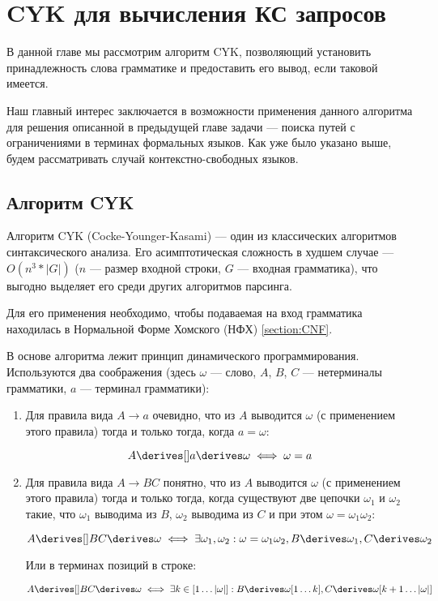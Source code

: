 \section{CYK для вычисления КС запросов}

В данной главе мы рассмотрим алгоритм CYK, позволяющий установить принадлежность слова грамматике и предоставить его вывод, если таковой имеется.

Наш главный интерес заключается в возможности применения данного алгоритма для решения описанной в предыдущей главе задачи --- поиска путей с ограничениями в терминах формальных языков. Как уже было указано выше, будем рассматривать случай контекстно-свободных языков.

\subsection{Алгоритм CYK}

Алгоритм CYK (Cocke-Younger-Kasami) –-- один из классических алгоритмов синтаксического анализа. Его асимптотическая сложность в худшем случае --- $O(n^3 * |G|)$ ($n$ --- размер входной строки, $G$ --- входная грамматика), что выгодно выделяет его среди других алгоритмов парсинга.

Для его применения необходимо, чтобы подаваемая на вход грамматика находилась в Нормальной Форме Хомского (НФХ) \ref{section:CNF}.  

В основе алгоритма лежит принцип динамического программирования. Используются два соображения (здесь $\omega$ --- слово, $A$, $B$, $C$ --- нетерминалы грамматики, $a$ --- терминал грамматики):  

\begin{enumerate}
\item Для правила вида $A \to a$ очевидно, что из $A$ выводится $\omega$ (с применением этого правила) тогда и только тогда, когда $a = \omega$:

\[
  A \derives[] a \derives \omega \iff \omega = a\]
  
\item Для правила вида $A \to B C$ понятно, что из $A$ выводится $\omega$ (с применением этого правила) тогда и только тогда, когда существуют две цепочки $\omega_1$ и $\omega_2$ такие, что $\omega_1$ выводима из $B$, $\omega_2$ выводима из $C$ и при этом $\omega = \omega_1 \omega_2$: 

\[A \derives[] B C \derives \omega \iff \exists \omega_1, \omega_2 : \omega = \omega_1 \omega_2, B \derives \omega_1, C \derives \omega_2\]

Или в терминах позиций в строке: 

\[A \derives[] B C \derives \omega \iff \exists k \in [1 \dots |\omega|] : B \derives \omega[1 \dots k], C \derives \omega[k+1 \dots |\omega|]\]
\end{enumerate}

